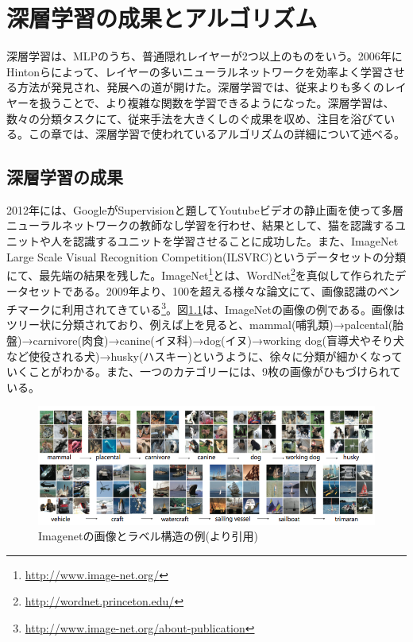 \chapter{深層学習の成果とアルゴリズム}
深層学習は、MLPのうち、普通隠れレイヤーが2つ以上のものをいう。2006年にHintonらによって、レイヤーの多いニューラルネットワークを効率よく学習させる方法が発見され、発展への道が開けた\cite{hinton2006a-fast, hinton2006reducing}。深層学習では、従来よりも多くのレイヤーを扱うことで、より複雑な関数を学習できるようになった。深層学習は、数々の分類タスクにて、従来手法を大きくしのぐ成果を収め、注目を浴びている。この章では、深層学習で使われているアルゴリズムの詳細について述べる。
\section{深層学習の成果}
2012年には、GoogleがSupervisionと題してYoutubeビデオの静止画を使って多層ニューラルネットワークの教師なし学習を行わせ、結果として、猫を認識するユニットや人を認識するユニットを学習させることに成功した。また、ImageNet Large Scale Visual Recognition Competition(ILSVRC)というデータセット\cite{deng2009imagenet:}の分類にて、最先端の結果を残した\cite{le2012building}。ImageNet\footnote{\url{http://www.image-net.org/}}とは、WordNet\footnote{\url{http://wordnet.princeton.edu/}}を真似して作られたデータセットである。2009年より、100を超える様々な論文にて、画像認識のベンチマークに利用されてきている\footnote{\url{http://www.image-net.org/about-publication}}。図\ref{c3_imagenet}は、ImageNetの画像の例である。画像はツリー状に分類されており、例えば上を見ると、mammal(哺乳類)→palcental(胎盤)→carnivore(肉食)→canine(イヌ科)→dog(イヌ)→working dog(盲導犬やそり犬など使役される犬)→husky(ハスキー)というように、徐々に分類が細かくなっていくことがわかる。また、一つのカテゴリーには、9枚の画像がひもづけられている。\par
\begin{figure}[tbp]
 \begin{center}
  \includegraphics[width=120mm]{img/c3/imagenet}
 \end{center}
 \caption{Imagenetの画像とラベル構造の例(\cite{deng2009imagenet:}より引用)}
 \label{c3_imagenet}
\end{figure}
